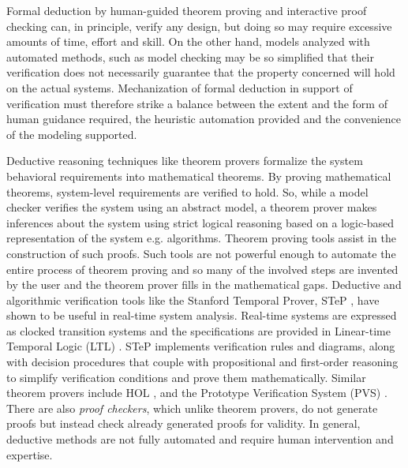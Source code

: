 Formal deduction by human-guided theorem proving and interactive proof checking can, in principle, verify any design, but doing so may require excessive amounts of time, effort and skill. On the other hand, models analyzed with automated methods, such as model checking may be so simplified that their verification does not necessarily guarantee that the property concerned will hold on the actual systems. Mechanization of formal deduction in support of verification must therefore strike a balance between the extent and the form of human guidance required, the heuristic automation provided and the convenience of the modeling supported. 


Deductive reasoning techniques like theorem provers formalize the system behavioral requirements into mathematical theorems. By proving mathematical theorems, system-level requirements are verified to hold. So, while a model checker verifies the system using an abstract model, a theorem prover makes inferences about the system using strict logical reasoning based on a logic-based representation of the system e.g. algorithms. Theorem proving tools assist in the construction of such proofs. Such tools are not powerful enough to automate the entire process of theorem proving and so many of the involved steps are invented by the user and the theorem prover fills in the mathematical gaps. Deductive and algorithmic verification tools like the Stanford Temporal Prover, STeP \cite{bjorner2001deductive}, have shown to be useful in real-time system analysis. Real-time systems are expressed as clocked transition systems and the specifications are provided in Linear-time Temporal Logic (LTL) \cite{gabbay1994temporal}. STeP implements verification rules and diagrams, along with decision procedures that couple with propositional and first-order reasoning to simplify verification conditions and prove them mathematically. Similar theorem provers include HOL \cite{gordon1993introduction}, and the Prototype Verification System (PVS) \cite{owre1992pvs}. There are also \emph{proof checkers}, which unlike theorem provers, do not generate proofs but instead check already generated proofs for validity. In general, deductive methods are not fully automated and require human intervention and expertise. 

